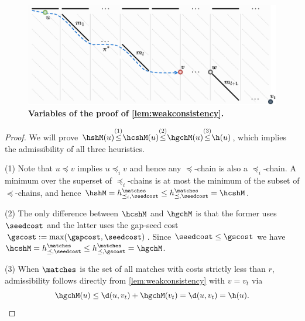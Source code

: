\begin{figure}[t]
    \centering
    \includegraphics[width=\linewidth]{imgs/proofs/recursive-h.pdf}%
    \caption[Variables of the proof of \cref{lem:weakconsistency}.]{\textbf{Variables of the proof of \cref{lem:weakconsistency}.}}
    \label{fig:recursive-h}
\end{figure}

\thmadmissible*
\begin{proof}
  We will prove $\hshM(u) {\overset{(1)}{\leq}} \hcshM(u) {\overset{(2)}{\leq}}
  \hgchM(u) {\overset{(3)}{\leq}} \h(u)$, which implies the admissibility of
  all three heuristics.

  (1) Note that $u\preceq v$ implies $u\preceq_i v$ and hence any
  $\preceq$-chain is also a $\preceq_i$-chain. A minimum over the superset of
  $\preceq_i$-chains is at most the minimum of the subset of $\preceq$-chains,
  and hence $\hshM = h^{\matches}_{\preceq_i, \seedcost} \leq
  h^{\matches}_{\preceq, \seedcost} = \hcshM$.
  
  (2) The only difference between $\hcshM$ and $\hgchM$ is that the
  former uses $\seedcost$ and the latter uses the gap-seed cost $\gscost :=
  \max(\gapcost, \seedcost)$. Since $\seedcost \leq \gscost$ we have $\hcshM =
  h^{\matches}_{\preceq, \seedcost} \leq h^{\matches}_{\preceq, \gscost} =
  \hgchM$.

  (3)
  When $\matches$ is the set of all matches with costs strictly less than $r$,
  admissibility follows directly from \cref{lem:weakconsistency} with $v = v_t$
  via
  \begin{equation*}
  \hgchM(u) \leq \d(u, v_t) + \hgchM(v_t) = \d(u, v_t) = \h(u).\qedhere
  \end{equation*}
\end{proof}

